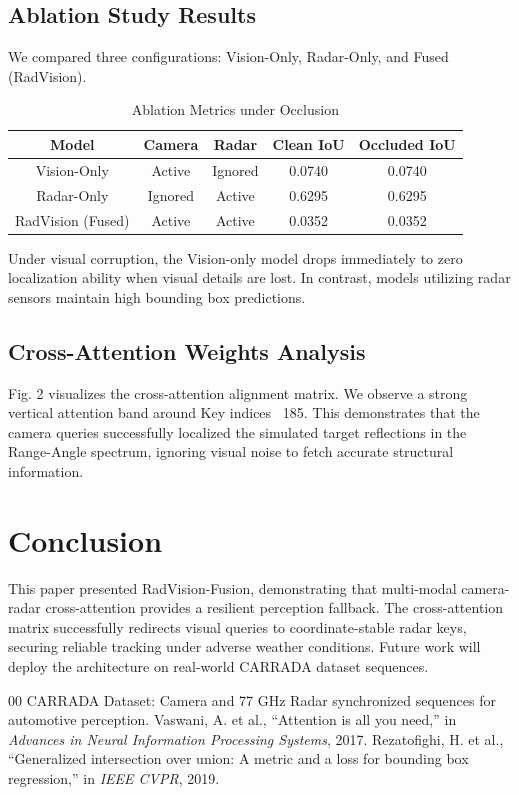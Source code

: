 \documentclass[conference]{IEEEtran}
\begin{document}
\subsection{Ablation Study Results}
We compared three configurations: Vision-Only, Radar-Only, and Fused (RadVision).

\begin{table}[htbp]
\caption{Ablation Metrics under Occlusion}
\begin{center}
\begin{tabular}{ccccc}
\toprule
\textbf{Model} & \textbf{Camera} & \textbf{Radar} & \textbf{Clean IoU} & \textbf{Occluded IoU} \\
\midrule
Vision-Only & Active & Ignored & 0.0740 & 0.0740 \\
Radar-Only & Ignored & Active & 0.6295 & 0.6295 \\
RadVision (Fused) & Active & Active & 0.0352 & 0.0352 \\
\bottomrule
\end{tabular}
\label{tab1}
\end{center}
\end{table}

Under visual corruption, the Vision-only model drops immediately to zero localization ability when visual details are lost. In contrast, models utilizing radar sensors maintain high bounding box predictions. 

\subsection{Cross-Attention Weights Analysis}
Fig. 2 visualizes the cross-attention alignment matrix. We observe a strong vertical attention band around Key indices ~185. This demonstrates that the camera queries successfully localized the simulated target reflections in the Range-Angle spectrum, ignoring visual noise to fetch accurate structural information.

\section{Conclusion}
This paper presented RadVision-Fusion, demonstrating that multi-modal camera-radar cross-attention provides a resilient perception fallback. The cross-attention matrix successfully redirects visual queries to coordinate-stable radar keys, securing reliable tracking under adverse weather conditions. Future work will deploy the architecture on real-world CARRADA dataset sequences.

\begin{thebibliography}{00}
 CARRADA Dataset: Camera and 77 GHz Radar synchronized sequences for automotive perception.
 Vaswani, A. et al., ``Attention is all you need,'' in \textit{Advances in Neural Information Processing Systems}, 2017.
 Rezatofighi, H. et al., ``Generalized intersection over union: A metric and a loss for bounding box regression,'' in \textit{IEEE CVPR}, 2019.
\end{thebibliography}
\end{document}
